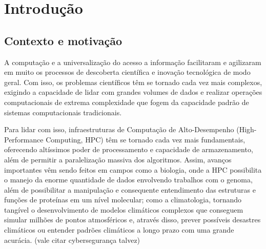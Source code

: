

\chapter{Introdução}
\label{cap:introducao}

\section{Contexto e motivação}

A computação e a universalização do acesso a informação facilitaram e agilizaram 
em muito os processos de descoberta científica e inovação tecnológica de modo geral. 
Com isso, os problemas científicos têm se tornado cada vez mais complexos, exigindo a capacidade
de lidar com grandes volumes de dados e realizar operações computacionais de extrema complexidade que fogem 
da capacidade padrão de sistemas computacionais tradicionais. 

Para lidar com isso, infraestruturas de Computação de Alto-Desempenho 
(High-Performance Computing, HPC) têm se tornado
cada vez mais fundamentais, oferecendo altíssimos poder de processamento e capacidade de armazenamento, 
além de permitir a paralelização massiva dos algoritmos. Assim, avanços importantes vêm sendo 
feitos em campos como a biologia, onde a HPC possibilita o manejo da enorme quantidade
de dados envolvendo trabalhos com o genoma, além de possibilitar a manipulação e consequente entendimento
das estruturas e funções de proteínas em um nível molecular; como a climatologia, tornando tangível o 
desenvolvimento de modelos climáticos complexos que conseguem simular milhões de pontos atmosféricos e, através disso, 
prever possíveis desastres climáticos ou entender padrões climáticos a longo prazo com uma grande acurácia. (vale citar cybersegurança talvez)

